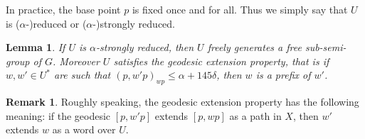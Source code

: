 \documentclass[JEP,XML,SOM,Unicode, NoEqCountersInSection,published]{cedram}
\theoremstyle{plain}
\newtheorem{lem}[thm]{Lemma}
\theoremstyle{definition}
\newtheorem{rem}[thm]{Remark}
\begin{document}
In practice, the base point $p$ is fixed once and for all.
Thus we simply say that $U$ is ($\alpha$-)reduced or ($\alpha$-)strongly reduced.

\begin{lem}
\label{res: free-sub-semigroup}
If $U$ is $\alpha$-strongly reduced, then $U$ freely generates a free sub-semi-group of $G$.
Moreover $U$ satisfies the \emph{geodesic extension property}, that is if $w, w' \in U^*$ are such that $(p, w'p)_{wp} \leq \alpha +145\delta$, then $w$ is a prefix of $w'$.
\end{lem}

\begin{rem}
Roughly speaking, the geodesic extension property has the following meaning: if the geodesic $[p, w'p]$ extends $[p, wp]$ as a path in $X$, then $w'$ extends $w$ as a word over $U$.
\end{rem}
\end{document}
